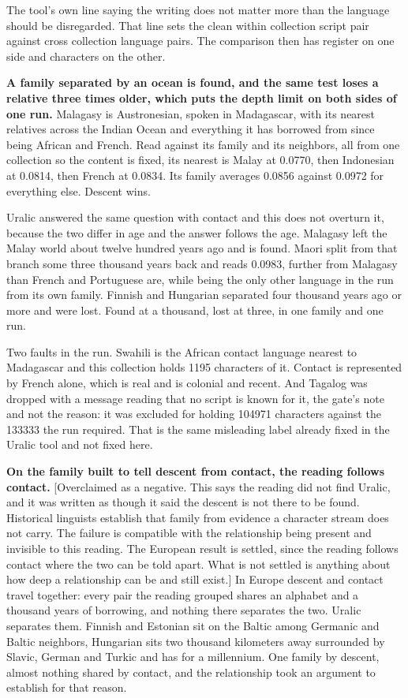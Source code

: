 The tool's own line saying the writing does not matter more than the language should be disregarded. That line sets the clean within collection script pair against cross collection language pairs. The comparison then has register on one side and characters on the other.

\textbf{A family separated by an ocean is found, and the same test loses a relative three times older, which puts the depth limit on both sides of one run.} Malagasy is Austronesian, spoken in Madagascar, with its nearest relatives across the Indian Ocean and everything it has borrowed from since being African and French. Read against its family and its neighbors, all from one collection so the content is fixed, its nearest is Malay at 0.0770, then Indonesian at 0.0814, then French at 0.0834. Its family averages 0.0856 against 0.0972 for everything else. Descent wins.

Uralic answered the same question with contact and this does not overturn it, because the two differ in age and the answer follows the age. Malagasy left the Malay world about twelve hundred years ago and is found. Maori split from that branch some three thousand years back and reads 0.0983, further from Malagasy than French and Portuguese are, while being the only other language in the run from its own family. Finnish and Hungarian separated four thousand years ago or more and were lost. Found at a thousand, lost at three, in one family and one run.

Two faults in the run. Swahili is the African contact language nearest to Madagascar and this collection holds 1195 characters of it. Contact is represented by French alone, which is real and is colonial and recent. And Tagalog was dropped with a message reading that no script is known for it, the gate's note and not the reason: it was excluded for holding 104971 characters against the 133333 the run required. That is the same misleading label already fixed in the Uralic tool and not fixed here.

\textbf{On the family built to tell descent from contact, the reading follows contact.} [Overclaimed as a negative. This says the reading did not find Uralic, and it was written as though it said the descent is not there to be found. Historical linguists establish that family from evidence a character stream does not carry. The failure is compatible with the relationship being present and invisible to this reading. The European result is settled, since the reading follows contact where the two can be told apart. What is not settled is anything about how deep a relationship can be and still exist.] In Europe descent and contact travel together: every pair the reading grouped shares an alphabet and a thousand years of borrowing, and nothing there separates the two. Uralic separates them. Finnish and Estonian sit on the Baltic among Germanic and Baltic neighbors, Hungarian sits two thousand kilometers away surrounded by Slavic, German and Turkic and has for a millennium. One family by descent, almost nothing shared by contact, and the relationship took an argument to establish for that reason.

